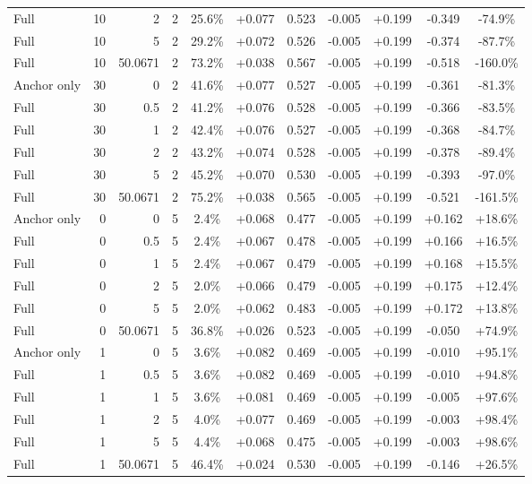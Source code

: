 \begin{table}[htbp]
\begin{tabular}{lrrrccccccc}
Full & 10 & 2 & 2 & 25.6\% & +0.077 & 0.523 & -0.005 & +0.199 & -0.349 & -74.9\% \\
Full & 10 & 5 & 2 & 29.2\% & +0.072 & 0.526 & -0.005 & +0.199 & -0.374 & -87.7\% \\
Full & 10 & 50.0671 & 2 & 73.2\% & +0.038 & 0.567 & -0.005 & +0.199 & -0.518 & -160.0\% \\
Anchor only & 30 & 0 & 2 & 41.6\% & +0.077 & 0.527 & -0.005 & +0.199 & -0.361 & -81.3\% \\
Full & 30 & 0.5 & 2 & 41.2\% & +0.076 & 0.528 & -0.005 & +0.199 & -0.366 & -83.5\% \\
Full & 30 & 1 & 2 & 42.4\% & +0.076 & 0.527 & -0.005 & +0.199 & -0.368 & -84.7\% \\
Full & 30 & 2 & 2 & 43.2\% & +0.074 & 0.528 & -0.005 & +0.199 & -0.378 & -89.4\% \\
Full & 30 & 5 & 2 & 45.2\% & +0.070 & 0.530 & -0.005 & +0.199 & -0.393 & -97.0\% \\
Full & 30 & 50.0671 & 2 & 75.2\% & +0.038 & 0.565 & -0.005 & +0.199 & -0.521 & -161.5\% \\
Anchor only & 0 & 0 & 5 & 2.4\% & +0.068 & 0.477 & -0.005 & +0.199 & +0.162 & +18.6\% \\
Full & 0 & 0.5 & 5 & 2.4\% & +0.067 & 0.478 & -0.005 & +0.199 & +0.166 & +16.5\% \\
Full & 0 & 1 & 5 & 2.4\% & +0.067 & 0.479 & -0.005 & +0.199 & +0.168 & +15.5\% \\
Full & 0 & 2 & 5 & 2.0\% & +0.066 & 0.479 & -0.005 & +0.199 & +0.175 & +12.4\% \\
Full & 0 & 5 & 5 & 2.0\% & +0.062 & 0.483 & -0.005 & +0.199 & +0.172 & +13.8\% \\
Full & 0 & 50.0671 & 5 & 36.8\% & +0.026 & 0.523 & -0.005 & +0.199 & -0.050 & +74.9\% \\
Anchor only & 1 & 0 & 5 & 3.6\% & +0.082 & 0.469 & -0.005 & +0.199 & -0.010 & +95.1\% \\
Full & 1 & 0.5 & 5 & 3.6\% & +0.082 & 0.469 & -0.005 & +0.199 & -0.010 & +94.8\% \\
Full & 1 & 1 & 5 & 3.6\% & +0.081 & 0.469 & -0.005 & +0.199 & -0.005 & +97.6\% \\
Full & 1 & 2 & 5 & 4.0\% & +0.077 & 0.469 & -0.005 & +0.199 & -0.003 & +98.4\% \\
Full & 1 & 5 & 5 & 4.4\% & +0.068 & 0.475 & -0.005 & +0.199 & -0.003 & +98.6\% \\
Full & 1 & 50.0671 & 5 & 46.4\% & +0.024 & 0.530 & -0.005 & +0.199 & -0.146 & +26.5\% \\

\end{tabular}
\end{table}
